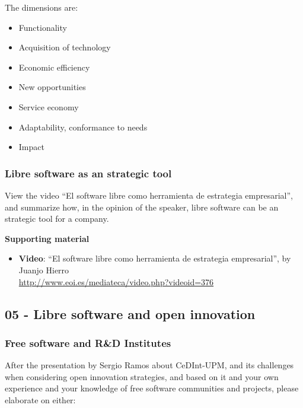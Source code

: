 \documentclass[a4paper]{article}
\begin{document}
The dimensions are:

\begin{itemize}
\item Functionality
\item Acquisition of technology
\item Economic efficiency
\item New opportunities
\item Service economy
\item Adaptability, conformance to needs
\item Impact
\end{itemize}


\subsubsection{Libre software as an strategic tool}
\label{sub:impact-strategic-tool}

View the video ``El software libre como herramienta de estrategia empresarial'', and summarize how, in the opinion of the speaker, libre software can be an strategic tool for a company.

\textbf{Supporting material}

\begin{itemize}
\item \textbf{Video}: ``El software libre como herramienta de estrategia empresarial'', by Juanjo Hierro \\
  \url{http://www.eoi.es/mediateca/video.php?videoid=376}
\end{itemize}

\subsection{05 - Libre software and open innovation}

\subsubsection{Free software and R\&D Institutes}
\label{sub:openinnova-rd}

After the presentation by Sergio Ramos about CeDInt-UPM, and its challenges when considering open innovation strategies, and based on it and your own experience and your knowledge of free software communities and projects, please elaborate on either:
\end{document}
